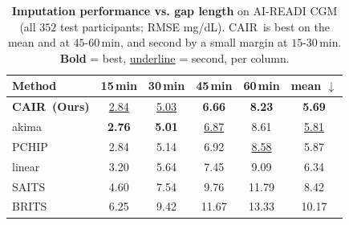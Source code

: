 \begin{table}[t]
  \centering
  {\small
  \setlength{\tabcolsep}{3.6pt}
  \begin{tabular}{lccccc}
    \toprule
    Method & 15\,min & 30\,min & 45\,min & 60\,min & \textbf{mean} $\downarrow$ \\
    \midrule
    \textbf{CAIR\ (Ours)}   & \underline{2.84} & \underline{5.03} & \textbf{6.66} & \textbf{8.23} & \textbf{5.69} \\
    akima                    & \textbf{2.76} & \textbf{5.01} & \underline{6.87} & 8.61 & \underline{5.81} \\
    PCHIP                    & 2.84 & 5.14 & 6.92 & \underline{8.58} & 5.87 \\
    linear                   & 3.20 & 5.64 & 7.45 & 9.09 & 6.34 \\
    SAITS                    & 4.60 & 7.54 & 9.76 & 11.79 & 8.42 \\
    BRITS                    & 6.25 & 9.42 & 11.67 & 13.33 & 10.17 \\
    \bottomrule
  \end{tabular}}
  \caption{\textbf{Imputation performance vs. gap length} on AI-READI CGM (all $352$ test
  participants; RMSE mg/dL). CAIR\ is best on the mean and at
  $45$-$60$\,min, and second by a small margin at $15$-$30$\,min.
  \textbf{Bold} = best, \underline{underline} = second, per column.}
  \label{tab:shortgap}
\end{table}

